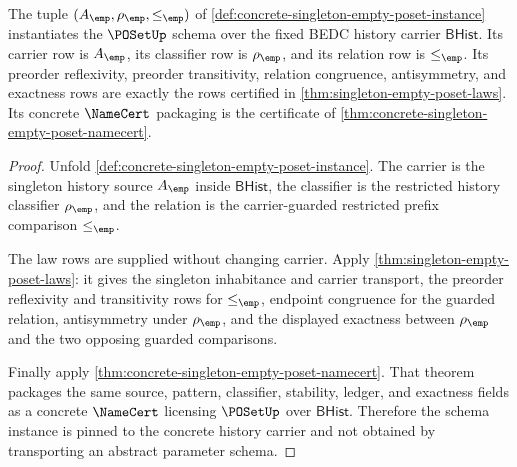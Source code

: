 \begin{theorem}
\label{thm:poset-singleton-schema-instantiated}
The tuple $(A_{\emp},\rho_{\emp},\le_{\emp})$ of
\autoref{def:concrete-singleton-empty-poset-instance} instantiates the
$\POSetUp$ schema over the fixed BEDC history carrier $\mathsf{BHist}$. Its
carrier row is $A_{\emp}$, its classifier row is $\rho_{\emp}$, and its
relation row is $\le_{\emp}$. Its preorder reflexivity, preorder
transitivity, relation congruence, antisymmetry, and exactness rows are exactly
the rows certified in \autoref{thm:singleton-empty-poset-laws}. Its concrete
$\NameCert$ packaging is the certificate of
\autoref{thm:concrete-singleton-empty-poset-namecert}.
\end{theorem}
\begin{proof}
Unfold \autoref{def:concrete-singleton-empty-poset-instance}. The carrier is
the singleton history source $A_{\emp}$ inside $\mathsf{BHist}$, the classifier
is the restricted history classifier $\rho_{\emp}$, and the relation is the
carrier-guarded restricted prefix comparison $\le_{\emp}$.

The law rows are supplied without changing carrier. Apply
\autoref{thm:singleton-empty-poset-laws}: it gives the singleton inhabitance
and carrier transport, the preorder reflexivity and transitivity rows for
$\le_{\emp}$, endpoint congruence for the guarded relation, antisymmetry under
$\rho_{\emp}$, and the displayed exactness between $\rho_{\emp}$ and the two
opposing guarded comparisons.

Finally apply
\autoref{thm:concrete-singleton-empty-poset-namecert}. That theorem packages
the same source, pattern, classifier, stability, ledger, and exactness fields
as a concrete $\NameCert$ licensing $\POSetUp$ over $\mathsf{BHist}$. Therefore
the schema instance is pinned to the concrete history carrier and not obtained
by transporting an abstract parameter schema.
\end{proof}

